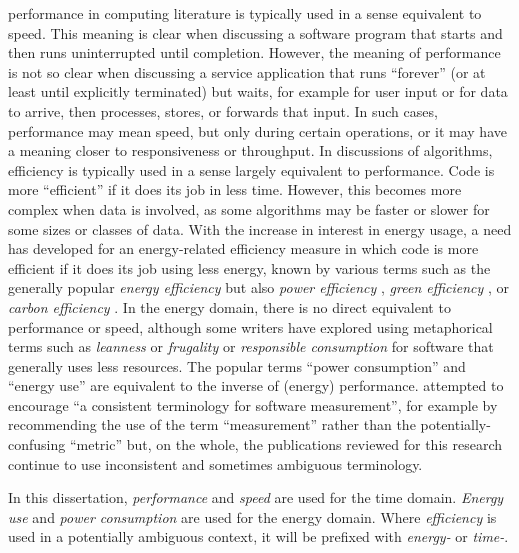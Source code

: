 \Gls{performance} in computing literature is typically used in a sense equivalent to \gls{speed}. This meaning is clear when discussing a software program that starts and then runs uninterrupted until completion. However, the meaning of performance is not so clear when discussing a service application that runs \enquote{forever} (or at least until explicitly terminated) but waits, for example for user input or for data to arrive, then processes, stores, or forwards that input. In such cases, performance may mean speed, but only during certain operations, or it may have a meaning closer to responsiveness or throughput. In discussions of algorithms, efficiency is typically used in a sense largely equivalent to performance. Code is more \enquote{efficient} if it does its job in less time. However, this becomes more complex when data is involved, as some algorithms may be faster or slower for some sizes or classes of data. With the increase in interest in energy usage, a need has developed for an energy-related efficiency measure in which code is more efficient if it does its job using less energy, known by various terms such as the generally popular \emph{energy efficiency} but also \emph{power efficiency} \citep{Manner2023} \citep{Chien2021}, \emph{green efficiency} \citep{Salam2018}, or \emph{carbon efficiency} \citep{Dorkal2023}. In the energy domain, there is no direct equivalent to performance or speed, although some writers have explored using metaphorical terms such as \emph{leanness} \citep{Wirth1995} or \emph{frugality} \citep{Gancarz2023b} or \emph{responsible consumption} \citep{Becker2015} for software that generally uses less resources. The popular terms \enquote{power consumption} and \enquote{energy use} are equivalent to the inverse of (energy) performance. \citet{Garcia2006} attempted to encourage \enquote{a consistent terminology for software measurement}, for example by recommending the use of the term \enquote{measurement} rather than the potentially-confusing \enquote{metric} but, on the whole, the publications reviewed for this research continue to use inconsistent and sometimes ambiguous terminology. 

\begin{leftbar}
In this dissertation, \emph{performance} and \emph{speed} are used for the time domain. \emph{Energy use} and \emph{power consumption} are used for the energy domain. Where \emph{efficiency} is used in a potentially ambiguous context, it will be prefixed with \emph{energy-} or \emph{time-}.
\end{leftbar}

